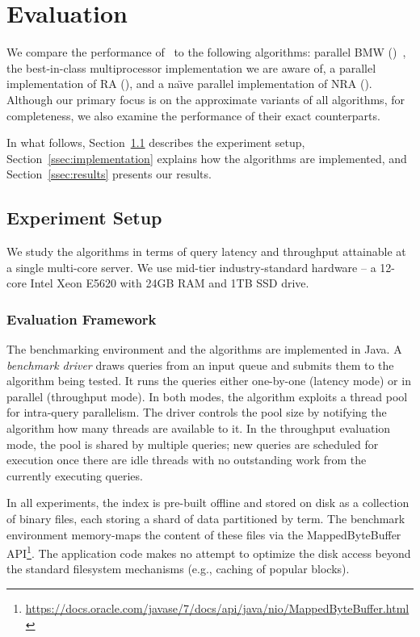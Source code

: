 \section{Evaluation} \label{sec:eval}

We compare the performance of \alg\ to the following algorithms: parallel BMW (\pBMW)~\cite{rojas2013efficient}, 
the best-in-class multiprocessor implementation we are aware of, a parallel implementation of RA (\pRA), 
and a na\"{\i}ve parallel implementation of NRA (\pNRA). Although our primary focus is on the approximate 
variants of all algorithms, for completeness, we also examine the performance of their exact counterparts.
%

In what follows, Section~\ref{ssec:setup} describes the experiment setup, 
Section~\ref{ssec:implementation} explains how the algorithms are 
implemented, and Section~\ref{ssec:results} presents our results.

\subsection{Experiment Setup}
\label{ssec:setup}

We study the algorithms in terms of query latency and throughput attainable at a single multi-core server. 
We use mid-tier industry-standard hardware -- a 12-core Intel Xeon E5620 with 24GB RAM and 1TB SSD drive. 

\subsubsection{Evaluation Framework}

The benchmarking environment and the algorithms  are implemented in Java. 
A  \emph{benchmark driver} draws queries from an input queue and submits them to the algorithm being tested. 
It runs the queries either one-by-one (latency mode) or in parallel (throughput mode).
In both modes, the algorithm exploits a thread pool for intra-query parallelism. 
The driver controls the pool size by notifying the algorithm how many threads are available to it.
In the throughput evaluation mode, the pool is shared by multiple queries; 
new queries are scheduled for execution once  there are idle threads with no outstanding work from 
the currently executing queries.


In all experiments, the index is pre-built offline and stored on disk as a collection of binary files, 
each storing a shard of data partitioned by term. The benchmark environment memory-maps the content 
of these files via the MappedByteBuffer API\footnote{\small{\url{https://docs.oracle.com/javase/7/docs/api/java/nio/MappedByteBuffer.html}}}. 
The application code makes no attempt to optimize the disk access beyond the standard filesystem mechanisms (e.g., caching 
of popular blocks). 

